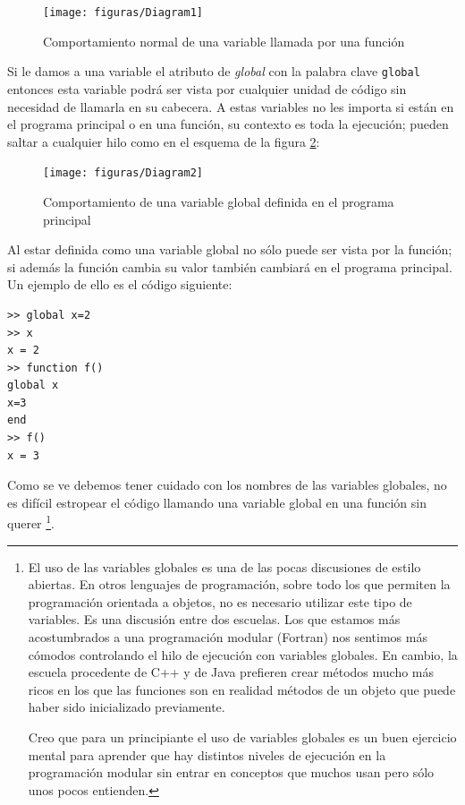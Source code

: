 %
\begin{figure}[h]
  \centering{}\texttt{[image: figuras/Diagram1]}


  \caption{\label{cap:Comportamiento-normal-de}Comportamiento normal
    de una variable llamada por una función}
\end{figure}


Si le damos a una variable el atributo de \emph{global} con la palabra
clave \texttt{global} entonces esta variable podrá ser
vista por cualquier unidad de código sin necesidad de llamarla en su
cabecera. A estas variables no les importa si están en el programa
principal o en una función, su contexto es toda la ejecución; pueden
saltar a cualquier hilo como en el esquema de la figura
\ref{cap:Comprtamiento-de-una}:

%
\begin{figure}[h]
  \centering{}\texttt{[image: figuras/Diagram2]}


  \caption{\label{cap:Comprtamiento-de-una}Comportamiento de una
    variable global definida en el programa principal}
\end{figure}


Al estar definida como una variable global no sólo puede ser vista por
la función; si además la función cambia su valor también cambiará en
el programa principal. Un ejemplo de ello es el código siguiente:

\begin{verbatim}
>> global x=2
>> x
x = 2
>> function f()
global x
x=3
end
>> f()
x = 3
\end{verbatim}
Como se ve debemos tener cuidado con los nombres de las variables
globales, no es difícil estropear el código llamando una variable
global en una función sin querer%
\footnote{El uso de las variables globales es una de las pocas
  discusiones de estilo abiertas. En otros lenguajes de programación,
  sobre todo los que permiten la programación orientada a objetos, no
  es necesario utilizar este tipo de variables. Es una discusión entre
  dos escuelas.  Los que estamos más acostumbrados a una programación
  modular (Fortran) nos sentimos más cómodos controlando el hilo de
  ejecución con variables globales. En cambio, la escuela procedente
  de C++ y de Java prefieren crear métodos mucho más ricos en los que
  las funciones son en realidad métodos de un objeto que puede haber
  sido inicializado previamente.

  Creo que para un principiante el uso de variables globales es un
  buen ejercicio mental para aprender que hay distintos niveles de
  ejecución en la programación modular sin entrar en conceptos que
  muchos usan pero sólo unos pocos entienden.%
}.

